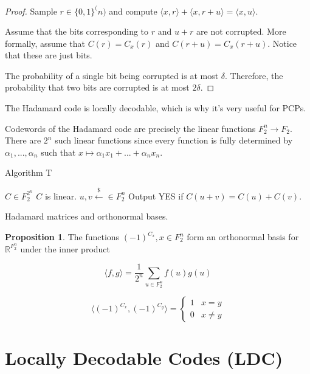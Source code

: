 \documentclass{article}
\theoremstyle{definition}
\newtheorem{proposition}[theorem]{Proposition}
\newcommand{\R}{\mathbb{R}}
\newcommand{\bitstring}[1]{\{0,1\}^{#1}}
\begin{document}
\begin{proof}
    Sample $r \in \bitstring(n)$ and compute $\langle x,r \rangle + \langle x,r+u \rangle = \langle x,u \rangle$.

    Assume that the bits corresponding to $r$ and $u+r$ are not corrupted.
    More formally, assume that $C(r) = C_{x}(r)$ and $C(r+u) = C_{x}(r+u)$. Notice that these are just bits.

    The probability of a single bit being corrupted is at most $\delta$. Therefore, the probability that two bits
    are corrupted is at most $2\delta$.


\end{proof}

The Hadamard code is locally decodable, which is why it's very useful for PCPs.

Codewords of the Hadamard code are precisely the linear functions
$F_{2}^{n} \xrightarrow{} F_{2}$. There are $2^{n}$ such linear functions since every function
is fully determined by $\alpha_{1}, ..., \alpha_{n}$ such that $x \mapsto \alpha_{1}x_{1} + ... + \alpha_{n}x_{n}$.

\begin{algorithm}
    \caption{Algorithm T}
    \begin{algorithmic}
        \Require $C \in F_{2}^{2^{n}}$
        \Ensure $C$ is linear.
        \State $u,v \xleftarrow{\$} \in F_{2}^{n}$
        \State Output YES if $C(u+v) = C(u) + C(v)$.
    \end{algorithmic}
\end{algorithm}

Hadamard matrices and orthonormal bases.



\begin{proposition}
    The functions $(-1)^{C_{x}}, x \in F_{2}^{n}$ form an orthonormal basis
    for $\R^{F_{2}^{n}}$ under the inner product

    \[ \langle f,g \rangle = \frac{1}{2^{n}}\sum_{u \in F_{2}^{n}} f(u)g(u) \]
\end{proposition}

\[ \langle (-1)^{C_{x}}, (-1)^{C_{y}} \rangle = \begin{cases}
    1 & x = y \\ 
    0 & x \neq y
\end{cases}\]

\newpage

\section{Locally Decodable Codes (LDC)}
\end{document}
